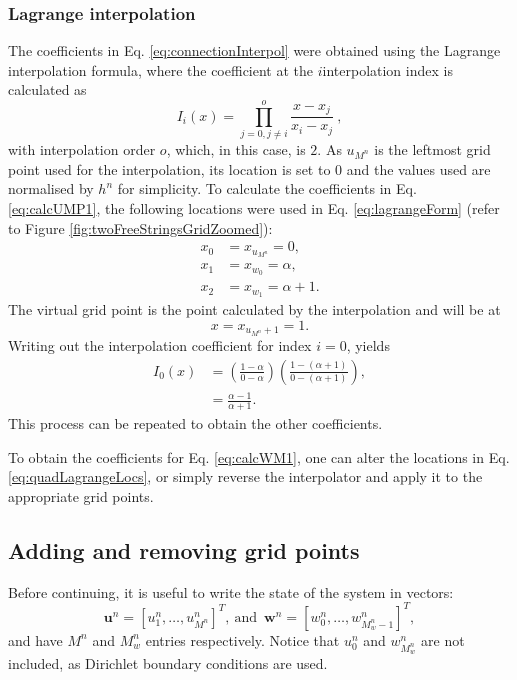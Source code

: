 \subsubsection{Lagrange interpolation}
The coefficients in Eq. \eqref{eq:connectionInterpol} were obtained using the Lagrange interpolation formula, where the coefficient at the $i$\th interpolation index is calculated as
\begin{equation}\label{eq:lagrangeForm}
    I_i(x) = \prod_{j = 0, j\neq i}^o \frac{x-x_j}{x_i-x_j}\ ,
\end{equation}
with interpolation order $o$, which, in this case, is $2$. As $u_{M^n}$ is the leftmost grid point used for the interpolation, its location is set to $0$ and the values used are normalised by $h^n$ for simplicity. To calculate the coefficients in Eq. \eqref{eq:calcUMP1}, the following locations were used in Eq. \eqref{eq:lagrangeForm} (refer to Figure \ref{fig:twoFreeStringsGridZoomed}):
\begin{equation}\label{eq:quadLagrangeLocs}
    \begin{aligned}
     x_0 &= x_{u_{M^n}} = 0, \\
     x_1 &= x_{w_0} = \alpha, \\
     x_2& = x_{w_1} = \alpha + 1.
    \end{aligned}
\end{equation}
The virtual grid point is the point calculated by the interpolation and will be at
\begin{equation}
    x = x_{u_{M^n}+1} = 1.
\end{equation}
Writing out the interpolation coefficient for index $i=0$, yields
\begin{align*}
    I_0(x)&= \left(\frac{1-\alpha}{0-\alpha}\right)\left(\frac{1-(\alpha+1)}{0-(\alpha+1)}\right), \\
    &=\frac{\alpha-1}{\alpha+1}.
\end{align*}
This process can be repeated to obtain the other coefficients. 

To obtain the coefficients for Eq. \eqref{eq:calcWM1}, one can alter the locations in Eq. \eqref{eq:quadLagrangeLocs}, or simply reverse the interpolator and apply it to the appropriate grid points. 

\subsection{Adding and removing grid points}\label{sec:addRemove}
Before continuing, it is useful to write the state of the system in vectors:
\begin{equation}
    \label{eq:separateStateVectors}
     \mathbf{u}^n = [u_1^n, \hdots, u_{M^n}^n]^T\!, \  \text{and} \ \; \mathbf{w}^n = [w_0^n, \hdots, w_{M_w^n-1}^n]^T,
\end{equation}
and have $M^n$ and $M_w^n$ entries respectively. Notice that $u_0^n$ and $w_{M_w^n}^n$ are not included, as Dirichlet boundary conditions are used.

